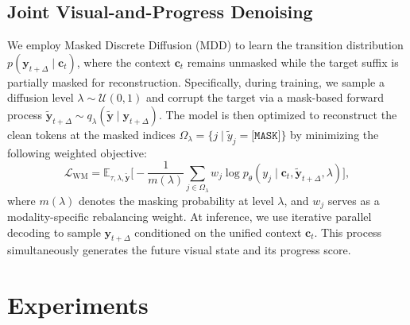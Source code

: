 \subsection{Joint Visual-and-Progress Denoising}
\label{sec:backbone}
We employ Masked Discrete Diffusion (MDD) to learn the transition distribution $p(\mathbf{y}_{t+\Delta} \mid \mathbf{c}_t)$, where the context $\mathbf{c}_t$ remains unmasked while the target suffix is partially masked for reconstruction. Specifically, during training, we sample a diffusion level $\lambda \sim \mathcal{U}(0,1)$ and corrupt the target via a mask-based forward process $\tilde{\mathbf{y}}_{t+\Delta} \sim q_\lambda(\tilde{\mathbf{y}} \mid \mathbf{y}_{t+\Delta})$. The model is then optimized to reconstruct the clean tokens at the masked indices $\Omega_\lambda = \{j \mid \tilde y_j = \texttt{[MASK]}\}$ by minimizing the following weighted objective:
\begin{equation}
\mathcal{L}_{\text{WM}}
=
\mathbb{E}_{\tau,\lambda,\tilde{\mathbf{y}}}
\Bigg[
-\frac{1}{m(\lambda)}
\sum_{j\in\Omega_\lambda}
w_j \log p_\theta\!\left(
y_j \mid
\mathbf{c}_t,\tilde{\mathbf{y}}_{t+\Delta},\lambda
\right)
\Bigg],
\label{eq:loss_total}
\end{equation}
where $m(\lambda)$ denotes the masking probability at level $\lambda$, and $w_j$ serves as a modality-specific rebalancing weight. At inference, we use iterative parallel decoding to sample $\mathbf{y}_{t+\Delta}$ conditioned on the unified context $\mathbf{c}_t$. This process simultaneously generates the future visual state and its progress score.

\section{Experiments}
\label{sec:experiments}

